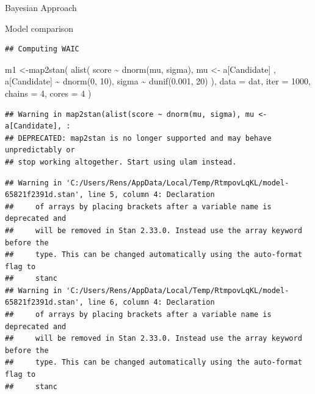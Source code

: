 \documentclass[
  ignorenonframetext,
]{beamer}
\newenvironment{Shaded}{\begin{snugshade}}{\end{snugshade}}
\newcommand{\AttributeTok}[1]{\textcolor[rgb]{0.77,0.63,0.00}{#1}}
\newcommand{\DecValTok}[1]{\textcolor[rgb]{0.00,0.00,0.81}{#1}}
\newcommand{\FloatTok}[1]{\textcolor[rgb]{0.00,0.00,0.81}{#1}}
\newcommand{\FunctionTok}[1]{\textcolor[rgb]{0.00,0.00,0.00}{#1}}
\newcommand{\NormalTok}[1]{#1}
\newcommand{\OtherTok}[1]{\textcolor[rgb]{0.56,0.35,0.01}{#1}}
\newcommand{\SpecialCharTok}[1]{\textcolor[rgb]{0.00,0.00,0.00}{#1}}
\begin{document}
\begin{frame}[fragile]{Bayesian Approach}
\begin{block}{Model comparison}
\begin{verbatim}
## Computing WAIC
\end{verbatim}

\begin{Shaded}
\begin{Highlighting}[]
\NormalTok{m1 }\OtherTok{\textless{}{-}}\FunctionTok{map2stan}\NormalTok{(}
  \FunctionTok{alist}\NormalTok{(}
\NormalTok{    score }\SpecialCharTok{\textasciitilde{}} \FunctionTok{dnorm}\NormalTok{(mu, sigma),}
\NormalTok{    mu }\OtherTok{\textless{}{-}}\NormalTok{ a[Candidate] ,}
\NormalTok{    a[Candidate] }\SpecialCharTok{\textasciitilde{}} \FunctionTok{dnorm}\NormalTok{(}\DecValTok{0}\NormalTok{, }\DecValTok{10}\NormalTok{),}
\NormalTok{    sigma }\SpecialCharTok{\textasciitilde{}} \FunctionTok{dunif}\NormalTok{(}\FloatTok{0.001}\NormalTok{, }\DecValTok{20}\NormalTok{)}
\NormalTok{  ), }\AttributeTok{data =}\NormalTok{ dat, }\AttributeTok{iter =} \DecValTok{1000}\NormalTok{, }\AttributeTok{chains =} \DecValTok{4}\NormalTok{, }\AttributeTok{cores =} \DecValTok{4}
\NormalTok{)}
\end{Highlighting}
\end{Shaded}

\begin{verbatim}
## Warning in map2stan(alist(score ~ dnorm(mu, sigma), mu <- a[Candidate], :
## DEPRECATED: map2stan is no longer supported and may behave unpredictably or
## stop working altogether. Start using ulam instead.
\end{verbatim}

\begin{verbatim}
## Warning in 'C:/Users/Rens/AppData/Local/Temp/RtmpovLqKL/model-65821f2391d.stan', line 5, column 4: Declaration
##     of arrays by placing brackets after a variable name is deprecated and
##     will be removed in Stan 2.33.0. Instead use the array keyword before the
##     type. This can be changed automatically using the auto-format flag to
##     stanc
## Warning in 'C:/Users/Rens/AppData/Local/Temp/RtmpovLqKL/model-65821f2391d.stan', line 6, column 4: Declaration
##     of arrays by placing brackets after a variable name is deprecated and
##     will be removed in Stan 2.33.0. Instead use the array keyword before the
##     type. This can be changed automatically using the auto-format flag to
##     stanc
\end{verbatim}


\end{block}
\end{frame}
\end{document}
